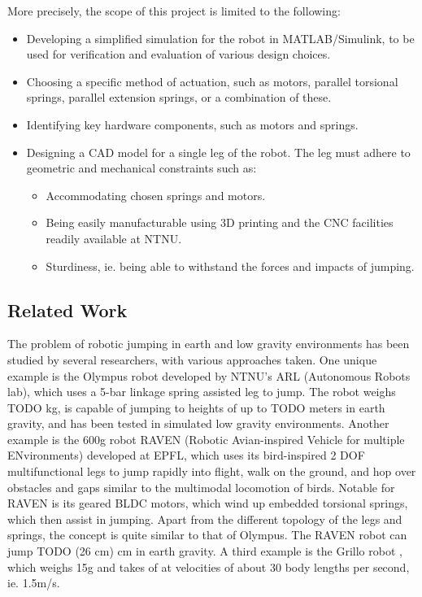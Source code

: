 More precisely, the scope of this project is limited to the following:
\begin{itemize}
    \item Developing a simplified simulation for the robot in MATLAB/Simulink, to be used for verification and evaluation of various design choices. 
    \item Choosing a specific method of actuation, such as motors, parallel torsional springs, parallel extension springs, or a combination of these.
    \item Identifying key hardware components, such as motors and springs. 
    \item Designing a CAD model for a single leg of the robot. The leg must adhere to geometric and mechanical constraints such as:
    \begin{itemize}
    \item Accommodating chosen springs and motors. 
    \item Being easily manufacturable using 3D printing and the CNC facilities readily available at NTNU.
    \item Sturdiness, ie. being able to withstand the forces and impacts of jumping. 
    \end{itemize}
\end{itemize}

\subsection{Related Work}

The problem of robotic jumping in earth and low gravity environments has been studied by several researchers, with various approaches taken. One unique example is the Olympus robot \cite{OLYMPUS1} \cite{OLYMPUS2} developed by NTNU's ARL (Autonomous Robots lab), which uses a 5-bar linkage spring assisted leg to jump. The robot weighs TODO kg, is capable of jumping to heights of up to TODO meters in earth gravity, and has been tested in simulated low gravity environments. Another example is the 600g robot RAVEN (Robotic Avian-inspired Vehicle for multiple ENvironments) \cite{RAVEN} developed at EPFL, which uses its bird-inspired 2 DOF multifunctional legs to jump rapidly into flight, walk on the ground, and hop over obstacles and gaps similar to the multimodal locomotion of birds. Notable for RAVEN is its geared BLDC motors, which wind up embedded torsional springs, which then assist in jumping. Apart from the different topology of the legs and springs, the concept is quite similar to that of Olympus. The RAVEN robot can jump TODO (26 cm) cm in earth gravity. A third example is the Grillo robot \cite{GRILLO}, which weighs 15g and takes of at velocities of about 30 body lengths per second, ie. 1.5m/s. 

